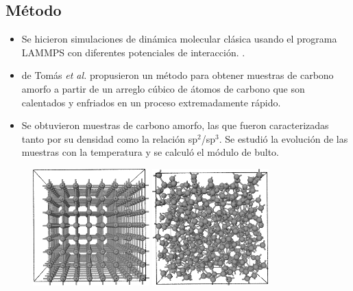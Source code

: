 \documentclass[a0]{sciposter}
\begin{document}
\begin{multicols}{2}
\section{Método}
\begin{itemize}
\item Se hicieron simulaciones de dinámica molecular clásica usando el programa LAMMPS con diferentes potenciales de interacci\'on. \cite{Lammps}.\\
\item de Tom\'as {\it et al.}\cite{ACPot1} propusieron un método para obtener muestras de carbono amorfo a partir de un arreglo cúbico de átomos de carbono que son calentados y enfriados en un proceso extremadamente r\'apido.\\
\item Se obtuvieron muestras de carbono amorfo, las que fueron caracterizadas tanto por su densidad como la relaci\'on sp$^2$/sp$^3$. Se estudi\'o la evoluci\'on de las muestras con la temperatura y se calcul\'o el módulo de bulto.
\end{itemize}
\begin{figure}
        \includegraphics[width=0.4\textwidth]{carbon1.png}
        \includegraphics[width=0.4\textwidth]{carbon2.png}
    \label{fig:carbon}
\end{figure}

\end{multicols}
\end{document}
